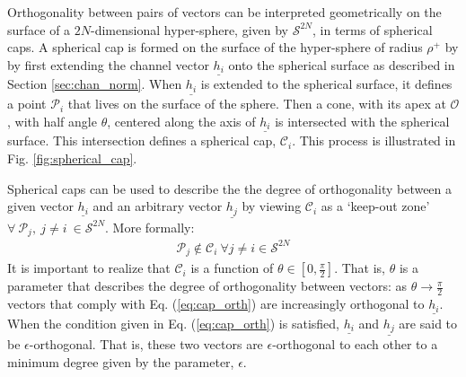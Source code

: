 Orthogonality between pairs of vectors can be interpreted geometrically on the surface of a $2N$-dimensional hyper-sphere, given by $\mathcal{S}^{2N}$,  in terms of spherical caps. A spherical cap is formed on the surface of the hyper-sphere of radius $\rho^+$ by by first extending the channel vector $\underline{h_i}$ onto the spherical surface as described in Section \ref{sec:chan_norm}. When $\underline{h_i}$ is extended to the spherical surface, it defines a point $\mathcal{P}_i$ that lives on the surface of the sphere. Then a cone, with its apex at $\mathcal{O}$, with half angle $\theta$, centered along the axis of $\underline{h_i}$ is intersected with the spherical surface. This intersection defines a spherical cap, $\mathcal{C}_i$. This process is illustrated in Fig. \ref{fig:spherical_cap}. 

Spherical caps can be used to describe the the degree of orthogonality between a given vector $\underline{h_i}$ and an arbitrary vector $\underline{h_j}$ by viewing $\mathcal{C}_i$ as a `keep-out zone' $\forall \  \mathcal{P}_j,\ j\neq i \ \in \mathcal{S}^{2N}$. More formally:
\begin{equation}\label{eq:cap_orth}
    \begin{aligned}
    \mathcal{P}_j \not\in \mathcal{C}_i\ \forall j\neq i \in \mathcal{S}^{2N}
    \end{aligned}
\end{equation}
It is important to realize that $\mathcal{C}_i$ is a function of $\theta \in [0,\frac{\pi}{2}]$. That is, $\theta$ is a parameter that describes the degree of orthogonality between vectors: as $\theta \rightarrow \frac{\pi}{2}$ vectors that comply with Eq. (\ref{eq:cap_orth}) are increasingly orthogonal to $\underline{h_i}$. When the condition given in Eq. (\ref{eq:cap_orth}) is satisfied, $\underline{h_i}$ and $\underline{h_j}$ are said to  be $\epsilon$-orthogonal. That is, these two vectors are $\epsilon$-orthogonal to each other to a minimum degree given by the parameter, $\epsilon$.

